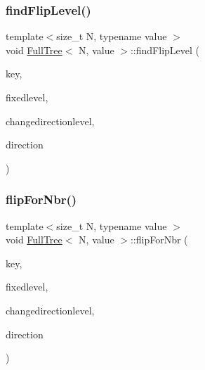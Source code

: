\subsubsection{\texorpdfstring{find\+Flip\+Level()}{findFlipLevel()}}
{\footnotesize\ttfamily template$<$size\+\_\+t N, typename value $>$ \\
void \mbox{\hyperlink{classFullTree}{Full\+Tree}}$<$ N, value $>$\+::find\+Flip\+Level (\begin{DoxyParamCaption}\item[{\mbox{\hyperlink{definitions_8h_af8682350bd8bb38ee9023f7a0a310add}{morton}}$<$ \mbox{\hyperlink{params_8h_a869e77c8856c40dc7369197ee4ee8059ab8317ae7816b83628f4e2bcff586e2f5}{W\+S\+I\+ZE}} $>$}]{key,  }\item[{\mbox{\hyperlink{definitions_8h_a69aa29b598b851b0640aa225a9e5d61d}{uint}}}]{fixedlevel,  }\item[{\mbox{\hyperlink{definitions_8h_a69aa29b598b851b0640aa225a9e5d61d}{uint}} $\ast$}]{changedirectionlevel,  }\item[{\mbox{\hyperlink{definitions_8h_a69aa29b598b851b0640aa225a9e5d61d}{uint}} $\ast$}]{direction }\end{DoxyParamCaption})}

\mbox{\label{classFullTree_ad3d930eda377be811df22070f6364865}} 
\subsubsection{\texorpdfstring{flip\+For\+Nbr()}{flipForNbr()}}
{\footnotesize\ttfamily template$<$size\+\_\+t N, typename value $>$ \\
void \mbox{\hyperlink{classFullTree}{Full\+Tree}}$<$ N, value $>$\+::flip\+For\+Nbr (\begin{DoxyParamCaption}\item[{\mbox{\hyperlink{definitions_8h_af8682350bd8bb38ee9023f7a0a310add}{morton}}$<$ \mbox{\hyperlink{params_8h_a869e77c8856c40dc7369197ee4ee8059ab8317ae7816b83628f4e2bcff586e2f5}{W\+S\+I\+ZE}} $>$ $\ast$}]{key,  }\item[{\mbox{\hyperlink{definitions_8h_a69aa29b598b851b0640aa225a9e5d61d}{uint}}}]{fixedlevel,  }\item[{\mbox{\hyperlink{definitions_8h_a69aa29b598b851b0640aa225a9e5d61d}{uint}} $\ast$}]{changedirectionlevel,  }\item[{\mbox{\hyperlink{definitions_8h_a69aa29b598b851b0640aa225a9e5d61d}{uint}} $\ast$}]{direction }\end{DoxyParamCaption})}

